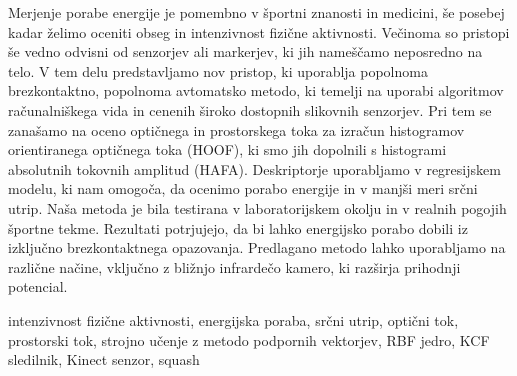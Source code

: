 \povzetekp
Merjenje porabe energije je pomembno v športni znanosti in medicini, še posebej kadar želimo oceniti obseg in intenzivnost fizične aktivnosti. Večinoma so pristopi še vedno odvisni od senzorjev ali markerjev, ki jih nameščamo neposredno na telo. V tem delu predstavljamo nov pristop, ki uporablja popolnoma brezkontaktno, popolnoma avtomatsko metodo, ki temelji na uporabi algoritmov računalniškega vida in cenenih široko dostopnih slikovnih senzorjev. Pri tem se zanašamo na oceno optičnega in prostorskega toka za izračun histogramov orientiranega optičnega toka (HOOF), ki smo jih dopolnili s histogrami absolutnih tokovnih amplitud (HAFA). Deskriptorje uporabljamo v regresijskem modelu, ki nam omogoča, da ocenimo porabo energije in v manjši meri srčni utrip. Naša metoda je bila testirana v laboratorijskem okolju in v realnih pogojih športne tekme. Rezultati potrjujejo, da bi lahko energijsko porabo dobili iz izključno brezkontaktnega opazovanja. Predlagano metodo lahko uporabljamo na različne načine, vključno z bližnjo infrardečo kamero, ki razširja prihodnji potencial.


\kljucnebesede intenzivnost fizične aktivnosti, energijska poraba, srčni utrip, optični tok, prostorski tok, strojno učenje z metodo podpornih vektorjev, RBF jedro, KCF sledilnik, Kinect senzor, squash